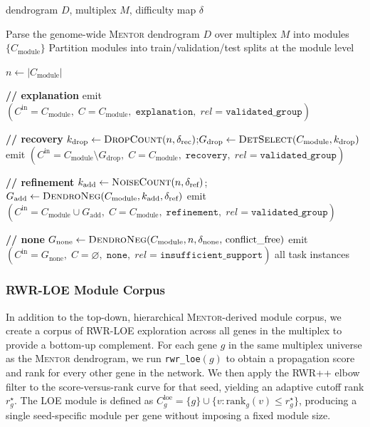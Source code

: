 \documentclass[thesis,letterpaper,12pt]{utthesis}
\begin{document}
\begin{algorithm}[t]
\caption{Creation of the \textsc{Mentor}-derived module training corpus}
\label{alg:mentor-module-corpus}
\begin{algorithmic}[1]
\Require dendrogram $D$, multiplex $M$, difficulty map $\delta$

\State Parse the genome-wide \textsc{Mentor} dendrogram $D$ over multiplex $M$ into modules $\{C_{\text{module}}\}$
\State Partition modules into train/validation/test splits at the module level

    \State $n \gets |C_{\text{module}}|$

    \State \textbf{// explanation}
    \State emit $(C^{\text{in}} = C_{\text{module}},\; C = C_{\text{module}},\; \texttt{explanation},\; rel=\texttt{validated\_group})$

    \State \textbf{// recovery}
    \State $k_{\text{drop}} \gets \textsc{DropCount}(n, \delta_{\text{rec}})$;\quad $G_{\text{drop}} \gets \textsc{DetSelect}(C_{\text{module}}, k_{\text{drop}})$
    \State emit $(C^{\text{in}} = C_{\text{module}} \setminus G_{\text{drop}},\; C = C_{\text{module}},\; \texttt{recovery},\; rel=\texttt{validated\_group})$

    \State \textbf{// refinement}
    \State $k_{\text{add}} \gets \textsc{NoiseCount}(n, \delta_{\text{ref}})$;\quad $G_{\text{add}} \gets \textsc{DendroNeg}(C_{\text{module}}, k_{\text{add}}, \delta_{\text{ref}})$
    \State emit $(C^{\text{in}} = C_{\text{module}} \cup G_{\text{add}},\; C = C_{\text{module}},\; \texttt{refinement},\; rel=\texttt{validated\_group})$

    \State \textbf{// none}
    \State $G_{\text{none}} \gets \textsc{DendroNeg}(C_{\text{module}}, n, \delta_{\text{none}},\, \text{conflict\_free})$
    \State emit $(C^{\text{in}} = G_{\text{none}},\; C = \varnothing,\; \texttt{none},\; rel=\texttt{insufficient\_support})$
\EndFor
\State \Return all task instances
\end{algorithmic}
\end{algorithm}

\subsubsection{RWR-LOE Module Corpus}\label{sec:loe-corpus}
In addition to the top-down, hierarchical \textsc{Mentor}-derived module corpus, we create a corpus of RWR-LOE exploration across all genes in the multiplex to provide a bottom-up complement. For each gene $g$ in the same multiplex universe as the \textsc{Mentor} dendrogram, we run \texttt{rwr\_loe}$(g)$ to obtain a propagation score and rank for every other gene in the network. We then apply the RWR++ elbow filter to the score-versus-rank curve for that seed, yielding an adaptive cutoff rank $r^\star_g$. The LOE module is defined as $C^{\text{loe}}_g = \{g\} \cup \{v : \mathrm{rank}_g(v) \le r^\star_g\}$, producing a single seed-specific module per gene without imposing a fixed module size.
\end{document}
